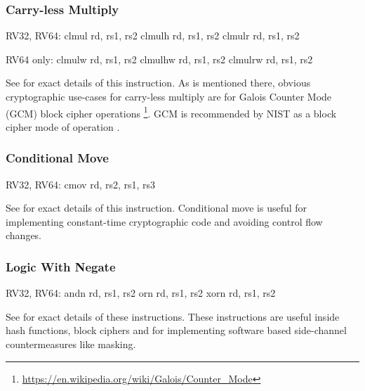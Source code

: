 
\subsubsection{Carry-less Multiply}

\begin{cryptobitmanipisa}
RV32, RV64:
    clmul rd, rs1, rs2
    clmulh rd, rs1, rs2
    clmulr rd, rs1, rs2

RV64 only:
    clmulw rd, rs1, rs2
    clmulhw rd, rs1, rs2
    clmulrw rd, rs1, rs2
\end{cryptobitmanipisa}

See \cite[Section 2.6]{riscv:bitmanip:draft} for exact details of
this instruction.
As is mentioned there, obvious cryptographic use-cases for carry-less
multiply are for Galois Counter Mode (GCM) block cipher operations
\footnote{\url{https://en.wikipedia.org/wiki/Galois/Counter_Mode}}.
GCM is recommended by NIST as a block cipher mode of operation
\cite{nist:gcm}.

\subsubsection{Conditional Move}

\begin{cryptobitmanipisa}
RV32, RV64:
    cmov rd, rs2, rs1, rs3
\end{cryptobitmanipisa}

See \cite[Section 2.9.2]{riscv:bitmanip:draft} for exact details of
this instruction.
Conditional move is useful for implementing constant-time cryptographic
code and avoiding control flow changes.

\subsubsection{Logic With Negate}

\begin{cryptobitmanipisa}
RV32, RV64:
    andn rd, rs1, rs2
     orn rd, rs1, rs2
    xorn rd, rs1, rs2
\end{cryptobitmanipisa}

See \cite[Section 2.1.3]{riscv:bitmanip:draft} for exact details of
these instructions.
These instructions are useful inside hash functions, block ciphers and
for implementing software based side-channel countermeasures like masking.

